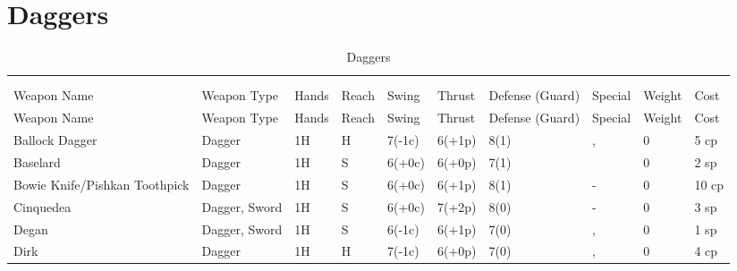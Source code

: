 \documentclass[oneside,11pt,english]{book}
\begin{document}
\section{Daggers}\vspace{-15pt}
\begin{longtabu} to 1\linewidth {X[2,l]XX[-1,c]X[-1,c]XXX[-1,c]X[2,l]X[-3,c]X[-3,r]}
  \captionsetup{labelformat=blank,textformat=empty}
  \caption{Daggers}\vspace{-15pt}\\
  \label{tab:Daggers List}\\
  Weapon Name                   & Weapon Type   & Hands & Reach & Swing  & Thrust & Defense (Guard) & Special                                                                                      & Weight	& Cost  \\\toprule\endfirsthead
  Weapon Name                   & Weapon Type   & Hands & Reach & Swing  & Thrust & Defense (Guard) & Special                                                                                      & Weight	& Cost  \\\toprule\endhead
  Ballock Dagger                & Dagger        & 1H    & H     & 7(-1c) & 6(+1p)	& 8(1)            & ,                                & 0      & 5 cp  \\
  Baselard                      & Dagger        & 1H    & S     & 6(+0c) & 6(+0p)	& 7(1)            &                                                               & 0      & 2 sp  \\
  Bowie Knife/Pishkan Toothpick	& Dagger        & 1H    & S     & 6(+0c) & 6(+1p)	& 8(1)            & -                                                                                            & 0      & 10 cp \\
  Cinquedea                     & Dagger, Sword	& 1H    & S     & 6(+0c) & 7(+2p)	& 8(0)            & -                                                                                            & 0      & 3 sp  \\
  Degan                         & Dagger, Sword	& 1H    & S     & 6(-1c) & 6(+1p)	& 7(0)            & ,                                & 0      & 1 sp  \\
  Dirk                          & Dagger        & 1H    & H     & 7(-1c) & 6(+0p)	& 7(0)            & ,                                & 0      & 4 cp  \\

\end{longtabu}
\end{document}
